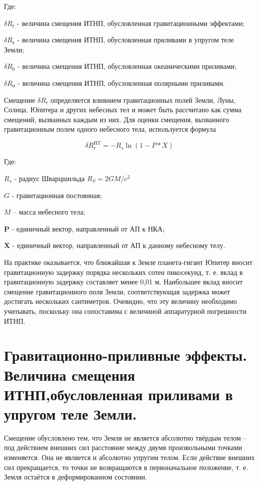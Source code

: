 \documentclass[14pt,a4paper,oneside]{extarticle}
\begin{document}
Где:

$\delta R_\text{г}$ - величина смещения ИТНП, обусловленная гравитационными эффектами;

$\delta R_\text{т}$ - величина смещения ИТНП, обусловленная приливами в упругом теле Земли;

$\delta R_\text{0}$ - величина смещения ИТНП, обусловленная океаническими приливами;

$\delta R_\text{п}$ - величина смещения ИТНП, обусловленная полярными приливами.

Смещение $\delta R_\text{г}$ определяется влиянием гравитационных полей Земли, Луны, Солнца, Юпитера и других небесных тел и может быть рассчитано как сумма смещений, вызванных каждым из них. Для оценки смещения, вызванного гравитационным полем одного небесного тела, используется формула

\[\delta R_\text{г}^{\mathrm{HT}}=-R_s\ln(1-P*X)\]

Где:

$R_s$ - радиус Шварцшильда $R_S=2GM/{c}^2$

$G$ - гравитационная постоянная;

$M$ – масса небесного тела;

$\boldsymbol{P}$ - единичный вектор, направленный от АП к НКА;

$\boldsymbol{X}$ - единичный вектор, направленный от АП к данному небесному телу.

На практике оказывается, что ближайшая к Земле планета-гигант Юпитер вносит гравитационную задержку порядка нескольких сотен пикосекунд, т. е. вклад в гравитационную задержку составляет менее 0,01 м. Наибольшее вклад вносит смещение гравитационного поля Земли, соответствующая задержка может достигать нескольких сантиметров. Очевидно, что эту величину необходимо учитывать, поскольку она сопоставима с величиной аппаратурной погрешности ИТНП.

\section{Гравитационно-приливные эффекты. Величина смещения ИТНП,обусловленная приливами в упругом теле Земли.}

Смещение обусловлено тем, что Земля не является абсолютно твёрдым телом – под действием внешних сил расстояние между двумя произвольными точками изменяется. Она не является и абсолютно упругим телом. Если действие внешних сил прекращается, то точки не возвращаются в первоначальное положение, т. е. Земля остаётся в деформированном состоянии.
\end{document}
